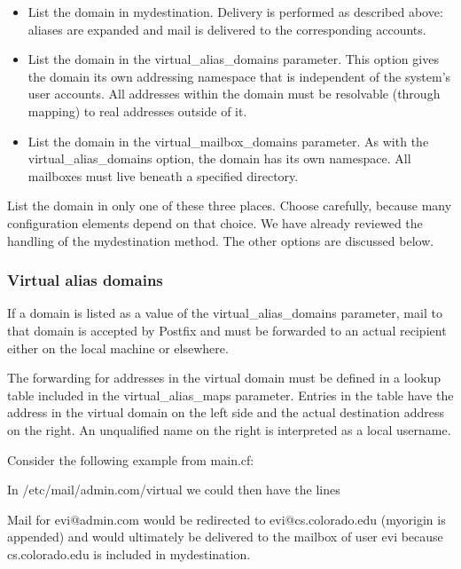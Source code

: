 \begin{itemize}
\item
  List the domain in {mydestination}. Delivery is performed as described
  above: aliases are expanded and mail is delivered to the corresponding
  accounts.
\item
  List the domain in the {virtual\_alias\_domains} parameter. This
  option gives the domain its own addressing namespace that is
  independent of the system's user accounts. All addresses within the
  domain must be resolvable (through mapping) to real addresses outside
  of it.
\item
  List the domain in the {virtual\_mailbox\_domains} parameter. As with
  the {virtual\_alias\_domains} option, the domain has its own
  namespace. All mailboxes must live beneath a specified directory.
\end{itemize}

List the domain in only one of these three places. Choose carefully,
because many configuration elements depend on that choice. We have
already reviewed the handling of the {mydestination} method. The other
options are discussed below.

\subsubsection[Virtual alias
domains]{\texorpdfstring{\protect\hypertarget{part0026_split_062.htmlux5cux23_idTextAnchor1185}{}{}Virtual
alias domains}{Virtual alias domains}}

If a domain is listed as a value of the {virtual\_alias\_domains}
parameter, mail to that domain is accepted by Postfix and must be
forwarded to an actual recipient either on the local machine or
elsewhere.

The forwarding for addresses in the virtual domain must be defined in a
lookup table included in the {virtual\_alias\_maps} parameter. Entries
in the table have the address in the virtual domain on the left side and
the actual destination address on the right. An unqualified name on the
right is interpreted as a local username.

Consider the following example from {main.cf}:


In {/etc/mail/admin.com/virtual} we could then have the lines


Mail for evi@admin.com would be redirected to evi@cs.colorado.edu
({myorigin} is appended) and would ultimately be delivered to the
mailbox of user evi because cs.colorado.edu is included in
{mydestination}.

